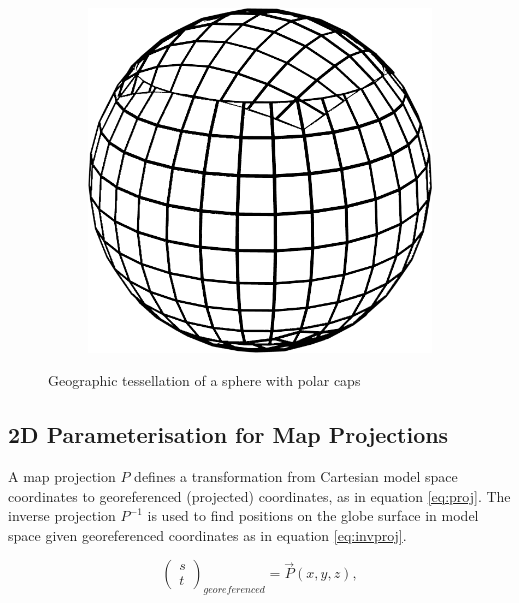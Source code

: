 \begin{figure}
\begin{subfigure}[b]{0.2\textwidth}
    \end{subfigure}
    ~ %
    \begin{subfigure}[b]{0.2\textwidth}
        \includegraphics[width=\textwidth]{figures/tessellation/tessellation_caps_proj3.png}
    \end{subfigure}
    \caption{Geographic tessellation of a sphere with polar caps}
    \label{fig:tesselation_caps}
\end{figure}

\subsection{2D Parameterisation for Map Projections}

A map projection $P$ defines a transformation from Cartesian model space coordinates to georeferenced (projected) coordinates, as in equation \ref{eq:proj}. The inverse projection $P^{-1}$ is used to find positions on the globe surface in model space given georeferenced coordinates as in equation \ref{eq:invproj}.

\begin{equation}
\label{eq:proj}
\begin{pmatrix} s  \\ t  \end{pmatrix}_{ georeferenced }=\vec { P } (x,y,z),
\end{equation}

